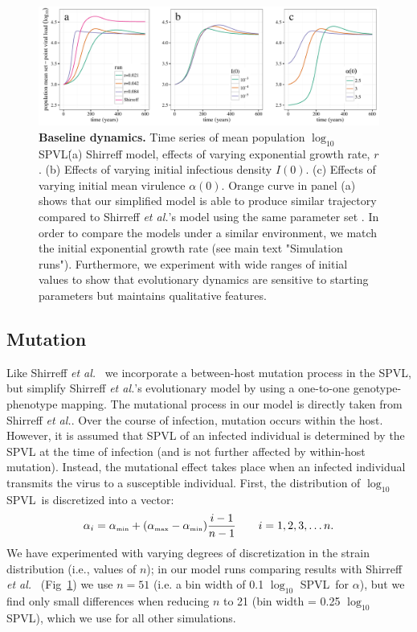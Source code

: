 \documentclass[10pt,letterpaper]{article}
\renewcommand{\figurename}{Fig}
\newcommand{\Lspvl}{$\log_{10}$ SPVL}
\newcommand{\etal}{\textit{et al.}}
\newcommand{\tsub}[2]{#1_{{\textrm{\tiny #2}}}}
\begin{document}
\begin{figure}[!ht]
\includegraphics[width=\textwidth]{../figures/fig1.pdf}
\caption{{\bf Baseline dynamics.}
Time series of mean population \Lspvl\. (a) Shirreff model, effects of varying exponential growth rate, $r$. (b) Effects of varying initial infectious density $I(0)$. (c) Effects of varying initial mean virulence $\alpha(0)$. Orange curve in panel (a) shows that our simplified model is able to produce similar trajectory compared to Shirreff \etal's model using the same parameter set \cite{shirreff_transmission_2011}. In order to compare the models under a similar environment, we match the initial exponential growth rate (see main text "Simulation runs"). Furthermore, we experiment with wide ranges of initial values to show that evolutionary dynamics are sensitive to starting parameters but maintains qualitative features.}
\label{fig:panel3}
\end{figure}

\subsection*{Mutation}

Like Shirreff \etal\ \cite{shirreff_transmission_2011} we incorporate a between-host mutation process in the SPVL, but simplify Shirreff \etal's evolutionary model by using a one-to-one genotype-phenotype mapping.
The mutational process in our model is directly taken from Shirreff \etal. Over the course of infection, mutation occurs within the host. However, it is assumed that SPVL of an infected individual is determined by the SPVL at the time of infection (and is not further affected by within-host mutation). Instead, the mutational effect takes place when an infected individual transmits the virus to a susceptible individual. First, the distribution of \Lspvl\ is discretized into a vector:
\begin{equation}
\alpha_i = \tsub{\alpha}{min} + (\tsub{\alpha}{max} - \tsub{\alpha}{min})\frac{i-1}{n-1} \qquad i = 1,2,3, \dots n.
\end{equation}
We have experimented with varying degrees of discretization in the strain distribution (i.e., values of $n$); in our model runs comparing results with Shirreff \etal\ \cite{shirreff_transmission_2011} (\figurename~\ref{fig:panel3}) we use $n=51$ (i.e. a bin width of 0.1 \Lspvl\ for $\alpha$), but we find only small differences when reducing $n$ to 21 (bin width = 0.25 \Lspvl), which we use for all other simulations.
\end{document}
